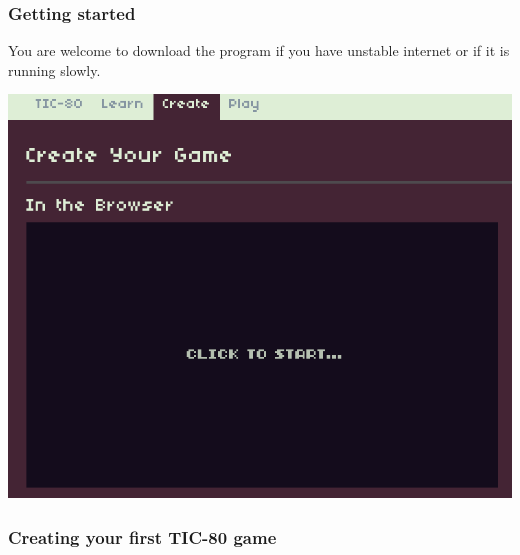 \documentclass{beamer}
\begin{document}
\begin{frame}
	\frametitle{Getting started}
	You are welcome to download the program if you have unstable internet or if it is running slowly.
	\begin{center}
		\includegraphics[width=0.7\linewidth]{starting.png}
	\end{center}
\end{frame}

\begin{frame}
	\frametitle{Creating your first TIC-80 game}
\end{frame}
\end{document}

